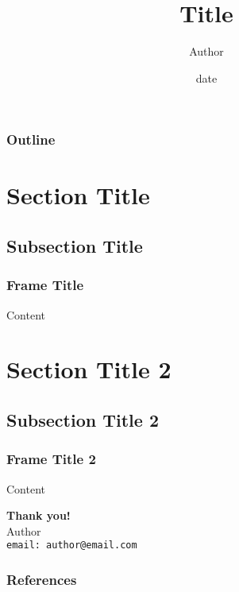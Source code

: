\documentclass{beamer}
\title[Title]{Title}
\author[Author]{Author}
\institute{Department\\ University\\ City, Country}
\date[date]{date}
\begin{document}
\begin{frame}
    \maketitle
\end{frame}

\frame
{ \frametitle{Outline}
{\small 
  \tableofcontents[]}
}


\section[Section]{Section Title}
\subsection{Subsection Title}

\begin{frame}
	\frametitle{Frame Title}
    Content
\end{frame}


\section[Section]{Section Title 2}
\subsection{Subsection Title 2}

\begin{frame}
	\frametitle{Frame Title 2}
    Content
\end{frame}
\begin{frame}
    \begin{center}
        {\Huge{\textbf{\textcolor[rgb]{0.00,0.00,1.00}{Thank you!}}}}\\
        \vspace{1cm}
        Author\\
        \texttt{email: author@email.com}
    \end{center}
\end{frame}



\begin{frame}[allowframebreaks]
    \frametitle{References}
        {\tiny 
        
        
        }
\end{frame}
\end{document}

